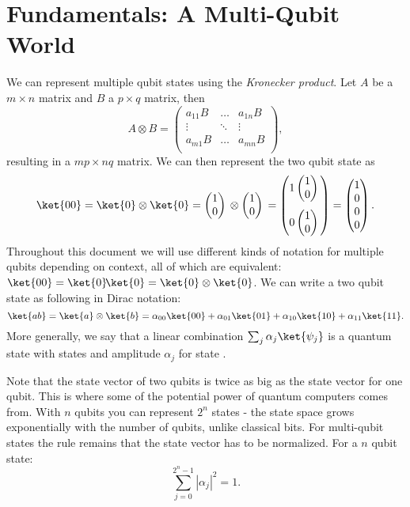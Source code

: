 \chapter{Fundamentals: A Multi-Qubit World}
We can represent multiple qubit states using the \emph{Kronecker product}. Let $A$ be a $m \times n$ matrix and $B$ a $p \times q$ matrix, then
\begin{equation}
  A \otimes B =
    \begin{pmatrix}
      a_{11}B & \dots & a_{1n}B \\
      \vdots & \ddots & \vdots \\
      a_{m1}B & \dots & a_{mn}B \\
    \end{pmatrix},
\end{equation}
resulting in a $mp \times nq$ matrix. We can then represent the two qubit state  as
\begin{equation}
  \ket{00} = \ket{0} \otimes \ket{0} = \qstatezero{} \otimes \qstatezero{} =
  \begin{pmatrix}
    1\qstatezero{} \\[13pt]
    0\qstatezero{}
  \end{pmatrix}
  =
  \begin{pmatrix}
    1 \\
    0 \\
    0 \\
    0
  \end{pmatrix}.
\end{equation}
Throughout this document we will use different kinds of notation for multiple qubits depending on context, all of which are equivalent: $\ket{00} = \ket{0}\!\ket{0} = \ket{0} \otimes \ket{0}$.
We can write a two qubit state as following in Dirac notation:
\begin{equation}
  \ket{ab} = \ket{a} \otimes \ket{b} = \alpha_{00}\ket{00} + \alpha_{01}\ket{01} + \alpha_{10}\ket{10} + \alpha_{11}\ket{11}.
\end{equation}
More generally, we say that a linear combination $\sum_{j} \alpha_j\ket{\psi_j}$ is a quantum state with states  and amplitude $\alpha_j$ for state .

Note that the state vector of two qubits is twice as big as the state vector for one qubit. This is where some of the potential power of quantum computers comes from. With $n$ qubits you can represent $2^n$ states - the state space grows exponentially with the number of qubits, unlike classical bits. For multi-qubit states the rule remains that the state vector has to be normalized. For a $n$ qubit state:
\begin{equation}
  \sum_{j = 0}^{2^n-1} |\alpha_j|^2 = 1.
\end{equation}

